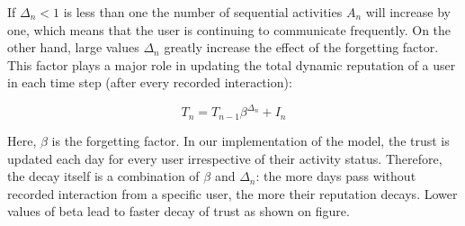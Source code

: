 If $\Delta_{n} < 1$ is less than one the number of sequential activities $A_{n}$ will increase by one, which means that the user is continuing to communicate frequently. On the other hand, large values $\Delta_{n}$ greatly increase the effect of the forgetting factor. This factor plays a major role in updating the total dynamic reputation of a user in each time step (after every recorded interaction):

\begin{equation}\label{eq:tn}
T_{n}=T_{n-1} \beta^{\Delta_{n}}+I_{n}
\end{equation}

Here, $\beta$ is the forgetting factor. In our implementation of the model, the trust is updated each day for every user irrespective of their activity status. Therefore, the decay itself is a combination of $\beta$ and $\Delta_n$: the more days pass without recorded interaction from a specific user, the more their reputation decays. Lower values of beta lead to faster decay of trust as shown on figure. %
















